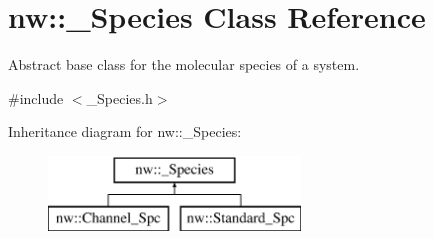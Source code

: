 \hypertarget{classnw_1_1___species}{\section{nw\+:\+:\+\_\+\+Species Class Reference}
\label{classnw_1_1___species}
}


Abstract base class for the molecular species of a system.  




{\ttfamily \#include $<$\+\_\+\+Species.\+h$>$}

Inheritance diagram for nw\+:\+:\+\_\+\+Species\+:\begin{figure}[H]
\begin{center}
\leavevmode
\includegraphics[height=2.000000cm]{d3/d03/classnw_1_1___species}
\end{center}
\end{figure}
